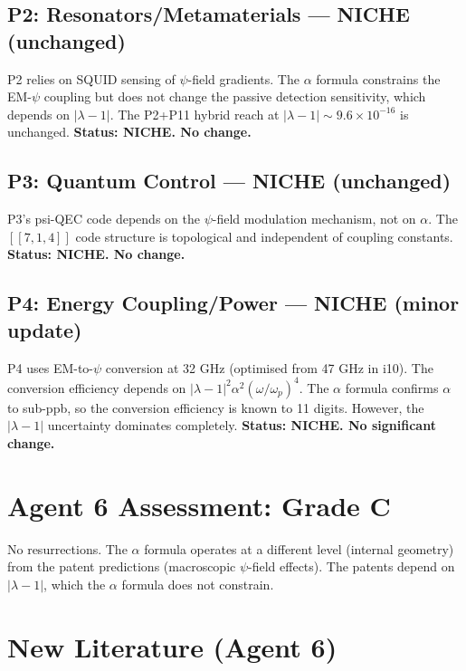 \documentclass[11pt,a4paper]{article}
\begin{document}
\subsection{P2: Resonators/Metamaterials --- NICHE (unchanged)}

P2 relies on SQUID sensing of $\psi$-field gradients. The $\alpha$ formula constrains the EM-$\psi$ coupling but does not change the passive detection sensitivity, which depends on $|\lambda - 1|$. The P2+P11 hybrid reach at $|\lambda - 1| \sim 9.6 \times 10^{-16}$ is unchanged. \textbf{Status: NICHE. No change.}

\subsection{P3: Quantum Control --- NICHE (unchanged)}

P3's psi-QEC code depends on the $\psi$-field modulation mechanism, not on $\alpha$. The $[[7,1,4]]$ code structure is topological and independent of coupling constants. \textbf{Status: NICHE. No change.}

\subsection{P4: Energy Coupling/Power --- NICHE (minor update)}

P4 uses EM-to-$\psi$ conversion at 32 GHz (optimised from 47 GHz in i10). The conversion efficiency depends on $|\lambda - 1|^2 \alpha^2 (\omega/\omega_p)^4$. The $\alpha$ formula confirms $\alpha$ to sub-ppb, so the conversion efficiency is known to 11 digits. However, the $|\lambda - 1|$ uncertainty dominates completely. \textbf{Status: NICHE. No significant change.}

\section{Agent 6 Assessment: Grade C}

No resurrections. The $\alpha$ formula operates at a different level (internal geometry) from the patent predictions (macroscopic $\psi$-field effects). The patents depend on $|\lambda - 1|$, which the $\alpha$ formula does not constrain.

\section{New Literature (Agent 6)}
\end{document}
